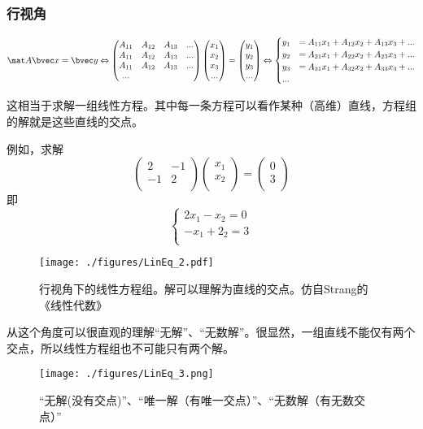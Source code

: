 \subsubsection{行视角}
$$
\mat A \bvec x=\bvec y \Leftrightarrow 
\begin{pmatrix}
A_{11}&A_{12}&A_{13}&...\\
A_{11}&A_{12}&A_{13}&...\\
A_{11}&A_{12}&A_{13}&...\\
...
\end{pmatrix}
\begin{pmatrix}
x_{1}\\
x_{2}\\
x_{3}\\
...\\
\end{pmatrix}
=
\begin{pmatrix}
y_{1}\\
y_{2}\\
y_{3}\\
...\\
\end{pmatrix}
\Leftrightarrow 
\begin{cases}
y_1&=A_{11}x_1+A_{12}x_2+A_{13}x_3+...\\
y_2&=A_{21}x_1+A_{22}x_2+A_{23}x_3+...\\
y_3&=A_{31}x_1+A_{32}x_2+A_{33}x_3+...\\
...&\\
\end{cases}
$$

这相当于求解一组线性方程。其中每一条方程可以看作某种（高维）直线，方程组的解就是这些直线的交点。

\begin{example}{}
例如，求解
$$
\begin{pmatrix}
2&-1\\
-1&2\\
\end{pmatrix}
\begin{pmatrix}
x_1\\
x_2\\
\end{pmatrix}
=
\begin{pmatrix}
0\\
3\\
\end{pmatrix}
$$
即
$$
\begin{cases}
2x_1-x_2=0\\
-x_1+2_2=3\\
\end{cases}
$$
\begin{figure}[ht]
\centering
\texttt{[image: ./figures/LinEq\_2.pdf]}
\caption{行视角下的线性方程组。解可以理解为直线的交点。仿自Strang的《线性代数》} \label{LinEq_fig2}
\end{figure}
\end{example}
从这个角度可以很直观的理解“无解”、“无数解”。很显然，一组直线不能仅有两个交点，所以线性方程组也不可能只有两个解。
\begin{figure}[ht]
\centering
\texttt{[image: ./figures/LinEq\_3.png]}
\caption{“无解(没有交点)”、“唯一解（有唯一交点）”、“无数解（有无数交点）”} \label{LinEq_fig3}
\end{figure}

